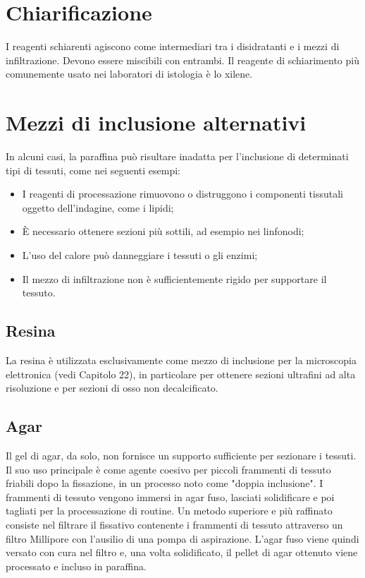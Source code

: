 \section{Chiarificazione}
I reagenti schiarenti agiscono come intermediari tra i disidratanti e i mezzi di infiltrazione. Devono essere miscibili con entrambi. Il reagente di schiarimento più comunemente usato nei laboratori di istologia è lo xilene.

\section{Mezzi di inclusione alternativi}
In alcuni casi, la paraffina può risultare inadatta per l'inclusione di determinati tipi di tessuti, come nei seguenti esempi:
\begin{itemize}
    \item I reagenti di processazione rimuovono o distruggono i componenti tissutali oggetto dell'indagine, come i lipidi;
    \item È necessario ottenere sezioni più sottili, ad esempio nei linfonodi;
    \item L'uso del calore può danneggiare i tessuti o gli enzimi;
    \item Il mezzo di infiltrazione non è sufficientemente rigido per supportare il tessuto.
\end{itemize}

\subsection{Resina}
La resina è utilizzata esclusivamente come mezzo di inclusione per la microscopia elettronica (vedi Capitolo 22), in particolare per ottenere sezioni ultrafini ad alta risoluzione e per sezioni di osso non decalcificato.

\subsection{Agar}
Il gel di agar, da solo, non fornisce un supporto sufficiente per sezionare i tessuti. Il suo uso principale è come agente coesivo per piccoli frammenti di tessuto friabili dopo la fissazione, in un processo noto come "doppia inclusione". I frammenti di tessuto vengono immersi in agar fuso, lasciati solidificare e poi tagliati per la processazione di routine. Un metodo superiore e più raffinato consiste nel filtrare il fissativo contenente i frammenti di tessuto attraverso un filtro Millipore con l'ausilio di una pompa di aspirazione. L'agar fuso viene quindi versato con cura nel filtro e, una volta solidificato, il pellet di agar ottenuto viene processato e incluso in paraffina.

